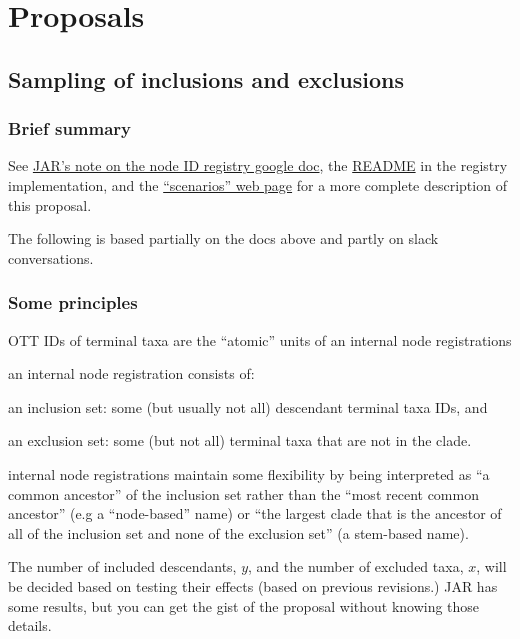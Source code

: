 \documentclass[11pt]{article}
\begin{document}
\section{Proposals}
\subsection{Sampling of inclusions and exclusions}
\subsubsection{Brief summary}
See \href{https://docs.google.com/document/d/1hJHjMckLywnoBuY1xG3I0hP-rsl4l8du3iA8kflEOQE/edit#}{JAR's note on the node ID registry google doc}, the 
\href{https://github.com/OpenTreeOfLife/reference-taxonomy/blob/registry/registry/README.md}{README} in the registry implementation,
and the \href{https://rawgit.com/OpenTreeOfLife/reference-taxonomy/registry/registry/doc/scenarios.html}{``scenarios'' web page} for 
a more complete description of this proposal.

The following is based partially on the docs above and partly on slack conversations.

\subsubsection{Some principles}
\begin{compactenum}
  \item OTT IDs of terminal taxa are the ``atomic'' units of an internal node registrations
  \item an internal node registration consists of:
  \begin{compactitem}
    \item an inclusion set: some (but usually not all) descendant terminal taxa IDs, and
    \item an exclusion set: some (but not all) terminal taxa that are not in the clade.
  \end{compactitem}
  \item internal node registrations maintain some flexibility by being interpreted as ``a 
  common ancestor'' of the inclusion set rather than the ``most recent common 
  ancestor'' (e.g a ``node-based'' name) or ``the largest clade that is the 
  ancestor of all of the inclusion set and none of the exclusion set'' (a stem-based name).
  \item The number of included descendants, $y$, and the number of excluded taxa, $x$, will
    be decided based on testing their effects (based on previous revisions.) JAR has some
    results, but you can get the gist of the proposal without knowing those details.
\end{compactenum}
\end{document}
